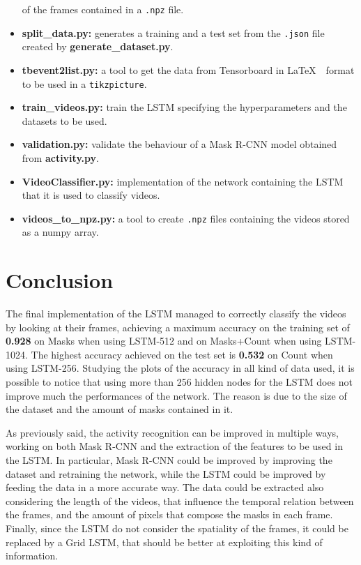 \documentclass[12pt]{article}
\numberwithin{equation}{section} %
\numberwithin{figure}{section} %
\numberwithin{table}{section} %
\theoremstyle{definition}
\begin{document}
\begin{itemize}
        of the frames contained in a
        \texttt{.npz} file.
    \item \textbf{split\_data.py:} generates a training and a
        test set from the \texttt{.json} file created by
        \textbf{generate\_dataset.py}.
    \item \textbf{tbevent2list.py:} a tool to get the 
        data from Tensorboard in \LaTeX\ \ format to be used
        in a \texttt{tikzpicture}.
    \item \textbf{train\_videos.py:} train the LSTM
        specifying the hyperparameters and the datasets
        to be used.
    \item \textbf{validation.py:} validate the behaviour
        of a Mask R-CNN model obtained from
        \textbf{activity.py}.
    \item \textbf{VideoClassifier.py:} implementation of
        the network containing the LSTM that it is used to
        classify videos.
    \item \textbf{videos\_to\_npz.py:} a tool to create
        \texttt{.npz} files containing the videos stored
        as a numpy array.
\end{itemize}


\section{Conclusion}

The final implementation of the LSTM managed to correctly
classify the videos by looking at their frames, achieving a
maximum accuracy on the training set of \textbf{0.928} on Masks
when using LSTM-512 and on Masks+Count when using LSTM-1024.
The highest accuracy achieved on the test set is \textbf{0.532}
on Count when using LSTM-256. Studying the plots of the
accuracy in all kind of data used, it is possible to
notice that using more than 256 hidden nodes for the LSTM 
does not improve much the performances of the network.
The reason
is due to the size of the dataset and the amount of masks
contained in it.

As previously said, the activity recognition can be improved
in multiple ways, working on both Mask R-CNN and the
extraction of the features to be used in the LSTM.
In particular, Mask R-CNN could be improved by improving
the dataset and retraining the network, while the LSTM
could be improved by feeding the data in a more accurate way.
The data could be extracted also considering the length
of the videos, that influence the temporal relation between
the frames, and the amount of pixels that compose the masks
in each frame.
Finally, since the LSTM do not consider the spatiality of the
frames, it could be replaced by a Grid LSTM, that
should be better at exploiting this kind of information.



\clearpage



\end{document}
